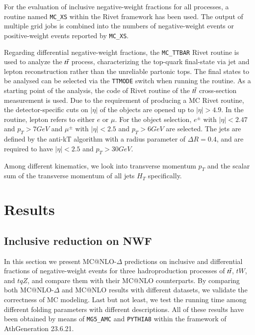 \documentclass[NOTE, REPORT=true, atlasdraft=true, USenglish]{atlasdoc}
\begin{document}
For the evaluation of inclusive negative-weight fractions for all processes, a routine named \texttt{MC\_XS} within the Rivet framework has been used. The output of multiple grid jobs is combined into the numbers of negative-weight events or positive-weight events reported by \texttt{MC\_XS}. 

Regarding differential negative-weight fractions, the \texttt{MC\_TTBAR} Rivet routine is used to analyze the $t\Bar{t}$ process, characterizing the top-quark final-state via jet and lepton reconstruction rather than the unreliable partonic tops. The final states to be analysed can be selected via the \texttt{TTMODE} switch when running the routine. As a starting point of the analysis, the code of Rivet routine of the $t\Bar{t}$ cross-section measurement is used.  Due to the requirement of producing a MC Rivet routine, the detector-specific cuts on $|\eta|$ of the objects are opened up to $|\eta|>4.9$. In the routine, lepton refers to either $e$ or $\mu$. For the object selection, $e^\pm$ with $|\eta|<2.47$ and $p_T>7GeV$ and $\mu^\pm$ with $|\eta|<2.5$ and $p_T>6GeV$ are selected. The jets are defined by the anti-kT algorithm\cite{Cacciari_2008} with a radius parameter of $\Delta R=0.4$, and are required to have $|\eta|<2.5$ and $p_T>30GeV$.

Among different kinematics, we look into transverse momentum $p_T$ and the scalar sum of the transverse momentum
of all jets $H_T$ specifically.



\chapter{Results}
\label{chap:result}
\section{Inclusive reduction on NWF}
In this section we present MC@NLO-$\Delta$ predictions on inclusive and differential fractions of negative-weight events for three hadroproduction processes of $t\Bar{t}$, $tW$, and $tqZ$, and compare them with their MC@NLO counterparts. By comparing both MC@NLO-$\Delta$ and MC@NLO results with different datasets, we validate the correctness of MC modeling. Last but not least, we test the running time among different folding parameters with different descriptions. All of these results have been obtained by means of \texttt{MG5\_AMC} and \texttt{PYTHIA8} within the framework of AthGeneration 23.6.21.
\end{document}
